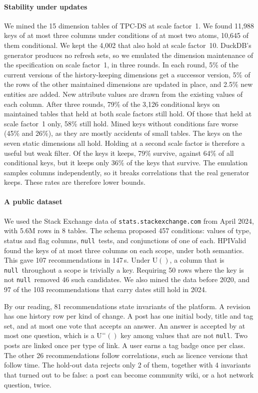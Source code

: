 \documentclass[conference]{IEEEtran}
\theoremstyle{definition}
\newcommand{\sql}[1]{\texttt{#1}}
\newcommand{\nul}{\texttt{null}}
\newcommand{\U}[1]{\mathrm{U}(#1)}
\newcommand{\Ueq}[1]{\mathrm{U}^{=}(#1)}
\begin{document}
\paragraph*{Stability under updates} We mined the 15 dimension tables of TPC-DS at scale factor~1. We found 11{,}988
keys of at most three columns under conditions of at most two atoms, 10{,}645 of them conditional. We kept the 4{,}002
that also hold at scale factor~10. DuckDB's generator produces no refresh sets, so we emulated the dimension maintenance
of the specification on scale factor~1, in three rounds. In each round, 5\% of the current versions of the
history-keeping dimensions get a successor version, 5\% of the rows of the other maintained dimensions are updated in
place, and 2.5\% new entities are added. New attribute values are drawn from the existing values of each column. After
three rounds, 79\% of the 3{,}126 conditional keys on maintained tables that held at both scale factors still hold. Of
those that held at scale factor~1 only, 58\% still hold. Mined keys without conditions fare worse (45\% and 26\%), as they
are mostly accidents of small tables. The keys on the seven static dimensions all hold. Holding at a second scale factor
is therefore a useful but weak filter. Of the keys it keeps, 79\% survive, against 64\% of all conditional keys, but it
keeps only 36\% of the keys that survive. The emulation samples columns independently, so it breaks correlations that the
real generator keeps. These rates are therefore lower bounds.

\paragraph*{A public dataset} We used the Stack Exchange data of \sql{stats.stackexchange.com} from April 2024, with
5.6M rows in 8 tables. The schema proposed 457 conditions: values of type, status and flag columns, \nul\ tests, and
conjunctions of one of each. HPIValid found the keys of at most three columns on each scope, under both semantics. This
gave 107 recommendations in 147\,s. Under $\U{}$, a column that is \nul\ throughout a scope is trivially a key. Requiring
50 rows where the key is not \nul\ removed 46 such candidates. We also mined the data before 2020, and 97 of the 103
recommendations that carry dates still hold in 2024.

By our reading, 81 recommendations state invariants of the platform. A revision has one history row per kind of
change. A post has one initial body, title and tag set, and at most one vote that accepts an answer. An answer is
accepted by at most one question, which is a $\Ueq{}$ key among values that are not \nul. Two posts are linked once per
type of link. A user earns a tag badge once per class. The other 26 recommendations follow correlations, such as
licence versions that follow time. The hold-out data rejects only 2 of them, together with 4 invariants that turned out
to be false: a post can become community wiki, or a hot network question, twice.
\end{document}
